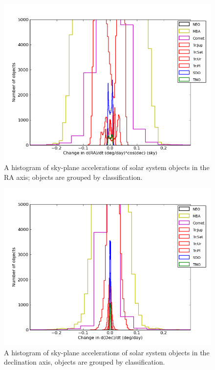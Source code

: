 \documentclass[12pt,preprint]{aastex}
\begin{document}
\begin{figure}[ht!]
  \begin{centering}
  \includegraphics[width=13cm]{illustrations/mopsplots/hist_accRA_sky2.png}
  \end{centering}
  \label{raAccSurvey}
  \caption{A histogram of sky-plane accelerations of solar system objects in the RA axis; objects are grouped by classification.}
\end{figure}

\begin{figure}[ht!]
  \begin{centering}
  \includegraphics[width=13cm]{illustrations/mopsplots/hist_accDec2.png}
  \end{centering}
  \label{decAccSurvey}
  \caption{A histogram of sky-plane accelerations of solar system objects in the declination axis, objects are grouped by classification.}
\end{figure}
\end{document}
